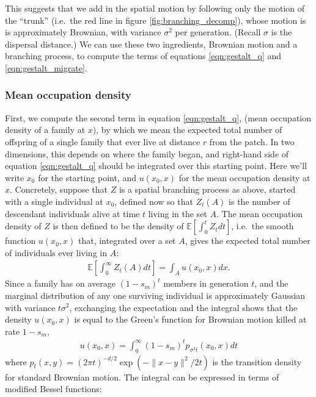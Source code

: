 \documentclass{article}
\newcommand{\E}{\mathbb{E}}
\begin{document}
This suggests that we add in the spatial motion by following only the motion of the ``trunk''
(i.e.\ the red line in figure \ref{fig:branching_decomp}),
whose motion is is approximately Brownian, with variance $\sigma^2$ per generation.
(Recall $\sigma$ is the dispersal distance.)
We can use these two ingredients, Brownian motion and a branching process, 
to compute the terms of equations \eqref{eqn:gestalt_q} and \eqref{eqn:gestalt_migrate}.


\subsubsection*{Mean occupation density}

First, we compute the second term in equation \eqref{eqn:gestalt_q}, (mean occupation density of a family at $x$),
by which we mean the expected total number of offspring of a single family that ever live at distance $r$ from the patch.
In two dimensions, this depends on where the family began, 
and right-hand side of equation \eqref{eqn:gestalt_q} should be integrated over this starting point.
Here we'll write $x_0$ for the starting point, and $u(x_0,x)$ for the mean occupation density at $x$.
Concretely, suppose that $Z$ is a spatial branching process as above, started with a single individual at $x_0$,
defined now so that $Z_t(A)$ is the number of descendant individuals alive at time $t$ living in the set $A$.
The mean occupation density of $Z$ is then defined to be the density of $\E[\int_0^t Z_t dt]$,
i.e.\ the smooth function $u(x_0,x)$ that, integrated over a set $A$, 
gives the expected total number of individuals ever living in $A$:
\begin{align} \label{eqn:occupation_density_defn}
    \E\left[ \int_0^\infty Z_t(A) dt \right] = \int_A u(x_0,x) dx .
\end{align}
Since a family has on average $(1-s_m)^t$ members in generation $t$,
and the marginal distribution of any one surviving individual is approximately Gaussian with variance $t \sigma^2$,
exchanging the expectation and the integral shows that
the density $u(x_0,x)$ is equal to the Green's function for Brownian motion killed at rate $1-s_m$,
\begin{align} \label{eqn:occupation_density_solution}
    u(x_0,x) = \int_0^\infty (1-s_m)^t p_{\sigma^2 t}(x_0,x) dt
\end{align}
where $p_t(x,y) = (2 \pi t)^{-d/2} \exp(-\|x-y\|^2/2t)$ is the transition density for standard Brownian motion.
The integral can be expressed in terms of modified Bessel functions:
\end{document}
